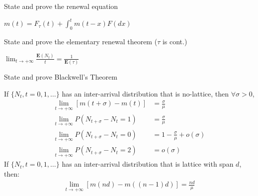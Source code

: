 \documentclass[11pt]{article}
\newcommand{\expect}[1]{\mathbf{E}(#1)}
\newcommand*{\xfield}[1]{\begin{mdframed}\centering #1\end{mdframed}\bigskip}
\newenvironment{field}{}{}
\newenvironment{note}{}{}
\begin{document}
%
\begin{note}
  \xfield{State and prove the renewal equation}
  \begin{field}
    \(m(t) = F_\tau(t) + \int_0^t m(t-x) F(dx)\)
  \end{field}
\end{note}
%
\begin{note}
  \xfield{State and prove the elementary renewal theorem (\(\tau\) is cont.)}
  \begin{field}
    \(\lim_{t \to +\infty} \frac{\expect{N_t}}{t} = \frac{1}{\expect{\tau}}\)
  \end{field}
\end{note}
%
\begin{note}
  \xfield{State and prove Blackwell's Theorem}
  \begin{field}
    If \(\{N_t, t = 0,1,\ldots\}\) has an inter-arrival distribution
    that is no-lattice, then \(\forall \sigma > 0\),
    \begin{align*}
      \lim_{t \to +\infty} [ m(t+\sigma) - m(t) ]
      & = \frac{\sigma}{\mu} \\
      \lim_{t \to +\infty} P(N_{t + \sigma} - N_t = 1)
      & = \frac{\sigma}{\mu} \\
      \lim_{t \to +\infty} P(N_{t+\sigma} - N_t = 0)
      & = 1 - \frac{\sigma}{\mu} + o(\sigma) \\
      \lim_{t \to +\infty} P(N_{t+\sigma} - N_t = 2)
      & = o(\sigma)
    \end{align*}
    If \(\{N_t, t = 0,1,\ldots\}\) has an inter-arrival distribution
    that is lattice with span \(d\), then:
    \begin{align*}
      \lim_{t \to +\infty} [ m(nd) - m((n-1)d)] = \frac{nd}{\mu}
    \end{align*}
  \end{field}
\end{note}
%
\end{document}

